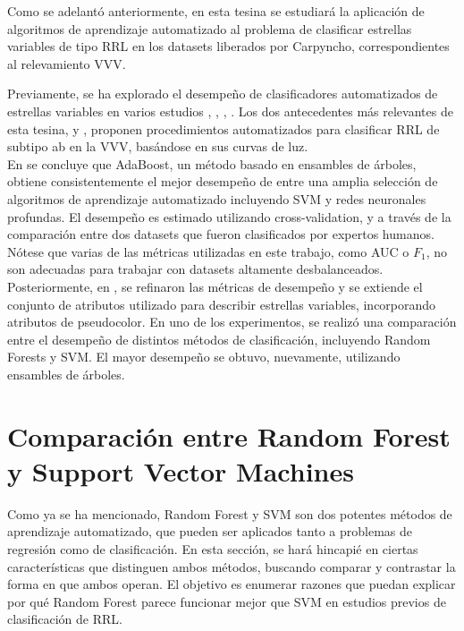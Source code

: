 \par Como se adelantó anteriormente, en esta tesina se estudiará la aplicación de algoritmos de aprendizaje automatizado al problema de clasificar estrellas variables de tipo RRL en los datasets liberados por Carpyncho, correspondientes al relevamiento VVV. \\

\par Previamente, se ha explorado el desempeño de clasificadores automatizados de estrellas variables en varios estudios \cite{ej1}, \cite{ej2}, \cite{ej3}, \cite{ej4}.  Los dos antecedentes más relevantes de esta tesina, \cite{elorrieta} y \cite{jbc}, proponen procedimientos automatizados para clasificar RRL de subtipo ab en la VVV, basándose en sus curvas de luz. \\

En \cite{elorrieta} se concluye que AdaBoost\cite{adaboost}, un método basado en ensambles de árboles, obtiene consistentemente el mejor desempeño de entre una amplia selección de algoritmos de aprendizaje automatizado incluyendo SVM y redes neuronales profundas. El desempeño es estimado utilizando cross-validation, y a través de la comparación entre dos datasets que fueron clasificados por expertos humanos. Nótese que varias de las métricas utilizadas en este trabajo, como AUC o $F_1$, no son adecuadas para trabajar con datasets altamente desbalanceados. \\

Posteriormente, en \cite{jbc}, se refinaron las métricas de desempeño y se extiende el conjunto de atributos utilizado para describir estrellas variables, incorporando atributos de pseudocolor. En uno de los experimentos, se realizó una comparación entre el desempeño de distintos métodos de clasificación, incluyendo Random Forests y SVM. El mayor desempeño se obtuvo, nuevamente, utilizando ensambles de árboles.


\section{ Comparación entre Random Forest y Support Vector Machines}

Como ya se ha mencionado, Random Forest y SVM son dos potentes métodos de aprendizaje automatizado, que pueden ser aplicados tanto a problemas de regresión como de clasificación. En esta sección, se hará hincapié en ciertas características que distinguen ambos métodos, buscando comparar y contrastar la forma en que ambos operan. El objetivo es enumerar razones que puedan explicar por qué Random Forest parece funcionar mejor que SVM en estudios previos de clasificación de RRL.\\

